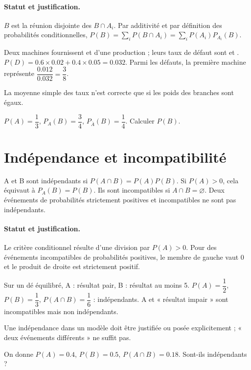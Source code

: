 \paragraph{Statut et justification.} $B$ est la réunion disjointe des $B\cap A_i$. Par additivité et par définition des probabilités conditionnelles, $P(B)=\sum_iP(B\cap A_i)=\sum_iP(A_i)P_{A_i}(B)$.
\begin{example}Deux machines fournissent  et  d’une production ; leurs taux de défaut sont  et . $P(D)=\num{0,6}\times\num{0,02}+\num{0,4}\times\num{0,05}=\num{0,032}$. Parmi les défauts, la première machine représente $\dfrac{\num{0,012}}{\num{0,032}}=\dfrac{3}{8}$.\end{example}\label{C05-EX2}
\begin{pitfall}La moyenne simple des taux n’est correcte que si les poids des branches sont égaux.\end{pitfall}
\begin{application}$P(A)=\dfrac{1}{3}$, $P_A(B)=\dfrac{3}{4}$, $P_{\overline A}(B)=\dfrac{1}{4}$. Calculer $P(B)$.\end{application}\label{C05-AP2}
\section{Indépendance et incompatibilité}\label{C05-U3}
\begin{keypoint}
A et B sont indépendants si $P(A\cap B)=P(A)P(B)$. Si $P(A)>0$, cela équivaut à $P_A(B)=P(B)$. Ils sont incompatibles si $A\cap B=\varnothing$. Deux événements de probabilités strictement positives et incompatibles ne sont pas indépendants.
\end{keypoint}
\paragraph{Statut et justification.} Le critère conditionnel résulte d’une division par $P(A)>0$. Pour des événements incompatibles de probabilités positives, le membre de gauche vaut 0 et le produit de droite est strictement positif.
\begin{example}Sur un dé équilibré, A : résultat pair, B : résultat au moins 5. $P(A)=\dfrac{1}{2}$, $P(B)=\dfrac{1}{3}$, $P(A\cap B)=\dfrac{1}{6}$ : indépendants. A et « résultat impair » sont incompatibles mais non indépendants.\end{example}\label{C05-EX3}
\begin{pitfall}Une indépendance dans un modèle doit être justifiée ou posée explicitement ; « deux événements différents » ne suffit pas.\end{pitfall}
\begin{application}On donne $P(A)=\num{0,4}$, $P(B)=\num{0,5}$, $P(A\cap B)=\num{0,18}$. Sont-ils indépendants ?\end{application}\label{C05-AP3}
